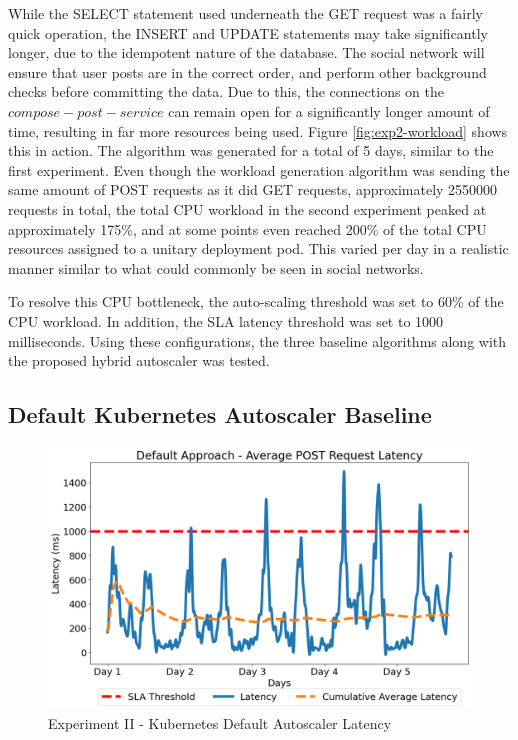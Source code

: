 While the SELECT statement used underneath the GET request was a fairly quick operation, the INSERT and UPDATE statements may take significantly longer, due to the idempotent nature of the database. The social network will ensure that user posts are in the correct order, and perform other background checks before committing the data. Due to this, the connections on the $compose-post-service$ can remain open for a significantly longer amount of time, resulting in far more resources being used. Figure \ref{fig:exp2-workload} shows this in action. The algorithm was generated for a total of 5 days, similar to the first experiment. Even though the workload generation algorithm was sending the same amount of POST requests as it did GET requests, approximately \num[group-separator={,}]{2550000} requests in total, the total CPU workload in the second experiment peaked at approximately 175\%, and at some points even reached 200\% of the total CPU resources assigned to a unitary deployment pod. This varied per day in a realistic manner similar to what could commonly be seen in social networks.\par

To resolve this CPU bottleneck, the auto-scaling threshold was set to 60\% of the CPU workload. In addition, the SLA latency threshold was set to 1000 milliseconds. Using these configurations, the three baseline algorithms along with the proposed hybrid autoscaler was tested.\par

\subsection {Default Kubernetes Autoscaler Baseline}
\label{subsec:ch5-exp2-default-algo}

\begin{figure}[htb]
    \centering
    \caption{Experiment II - Kubernetes Default Autoscaler Latency}
    \label{fig:exp2-default-k8s}
    \includegraphics[width=0.6\linewidth]{Figures/Compose-Post-Default-Latency.png}
\end{figure}

